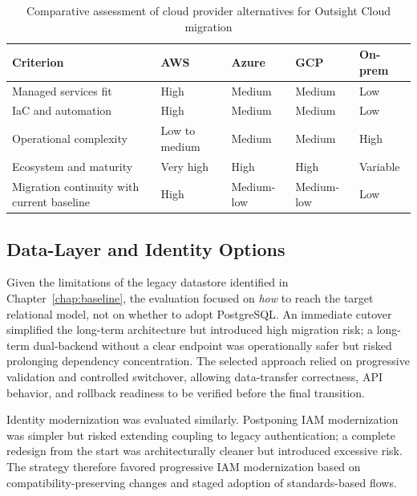 \begin{table}[H]
\centering
\small
\caption{Comparative assessment of cloud provider alternatives for Outsight Cloud migration}
\label{tab:cloud-provider-comparison}
\begin{tabular}{|p{3.0cm}|p{2.2cm}|p{2.2cm}|p{2.2cm}|p{2.2cm}|}
\hline
\textbf{Criterion} & \textbf{AWS} & \textbf{Azure} & \textbf{GCP} & \textbf{On-prem} \\
\hline
Managed services fit & High & Medium & Medium & Low \\
\hline
IaC and automation & High & Medium & Medium & Low \\
\hline
Operational complexity & Low to medium & Medium & Medium & High \\
\hline
Ecosystem and maturity & Very high & High & High & Variable \\
\hline
Migration continuity with current baseline & High & Medium-low & Medium-low & Low \\
\hline
\end{tabular}
\normalsize
\end{table}

\subsection{Data-Layer and Identity Options}
\label{sec:data-layer-options}
Given the limitations of the legacy datastore identified in Chapter~\ref{chap:baseline}, the evaluation focused on \emph{how} to reach the target relational model, not on whether to adopt PostgreSQL. An immediate cutover simplified the long-term architecture but introduced high migration risk; a long-term dual-backend without a clear endpoint was operationally safer but risked prolonging dependency concentration. The selected approach relied on progressive validation and controlled switchover, allowing data-transfer correctness, API behavior, and rollback readiness to be verified before the final transition.

Identity modernization was evaluated similarly. Postponing IAM modernization was simpler but risked extending coupling to legacy authentication; a complete redesign from the start was architecturally cleaner but introduced excessive risk. The strategy therefore favored progressive IAM modernization based on compatibility-preserving changes and staged adoption of standards-based flows.

